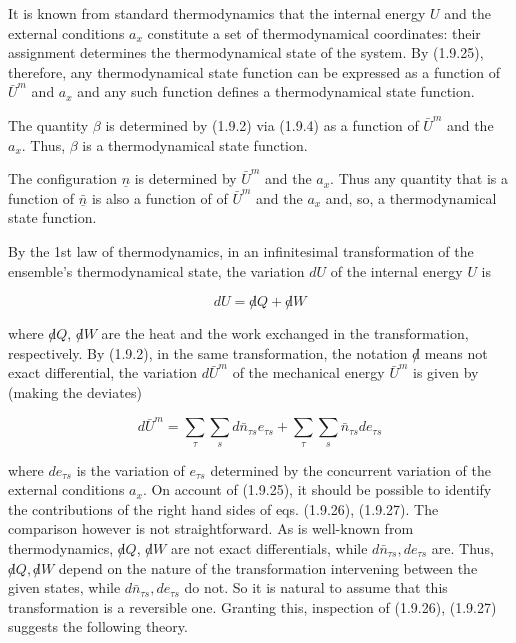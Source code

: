 \documentclass{article}
\begin{document}
It is known from standard thermodynamics that the internal energy $U$ and
the external conditions $a_{x}$ constitute a set of thermodynamical coordinates: their assignment determines the thermodynamical state of the system. By (1.9.25), therefore, any thermodynamical state function can be expressed as a function of $\bar{U}^{m}$ and $a_{x}$ and any such function defines a thermodynamical state function.

The quantity $\beta$ is determined by (1.9.2) via (1.9.4) as a function of $\bar{U}^{m}$ and the $a_{x}$. Thus, $\beta$ is a thermodynamical state function.

The configuration $\underline{n}$ is determined by $\bar{U}^{m}$ and the $a_{x}$. Thus any quantity that is a function of $\underline{\bar{n}}$ is also a function of of $\bar{U}^{m}$ and the $a_{x}$ and, so, a thermodynamical state function.

By the 1st law of thermodynamics, in an infinitesimal transformation of the ensemble's thermodynamical state, the variation $d U$ of the internal energy $U$ is

\begin{equation}
d U=\not d Q+\not d W \tag{1.9.26}
\end{equation}

where $\not d Q$, $\not d W$ are the heat and the work exchanged in the transformation, respectively. By (1.9.2), in the same transformation, the notation $\not d$ means not exact differential, the variation $d \bar{U}^{m}$ of the mechanical energy $\bar{U}^{m}$ is given by (making the deviates)

\begin{equation}
d \bar{U}^{m}=\sum_{\tau} \sum_{s} d \bar{n}_{\tau s} e_{\tau s}+\sum_{\tau} \sum_{s} \bar{n}_{\tau s} d e_{\tau s} \tag{1.9.27}
\end{equation}

where $d e_{\tau s}$ is the variation of $e_{\tau s}$ determined by the concurrent variation of the external conditions $a_{x}$. On account of (1.9.25), it should be possible to identify the contributions of the right hand sides of eqs. (1.9.26), (1.9.27). The comparison however is not straightforward. As is well-known from thermodynamics, $\not d Q$, $\not d W$ are not exact differentials, while $d \bar{n}_{\tau s}, d e_{\tau s}$ are. Thus, $\not d Q, \not d W$ depend on the nature of the transformation intervening between the given states, while $d \bar{n}_{\tau s}, d e_{\tau s}$ do not. So it is natural to assume that this transformation is a reversible one. Granting this, inspection of (1.9.26), (1.9.27) suggests the following theory.
\end{document}
